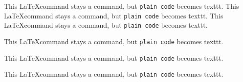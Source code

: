 This \LaTeX command stays a command, but \texttt{plain code} becomes texttt.
This \LaTeX command stays a command, but \texttt{plain code} becomes texttt.
This \LaTeX command stays a command, but \texttt{plain code} becomes texttt.
\begin{frame}[t]
This \LaTeX command stays a command, but \texttt{plain code} becomes texttt.
\end{frame}

\begin{frame}[t]
This \LaTeX command stays a command, but \texttt{plain code} becomes texttt.
\end{frame}

\begin{frame}[t]
This \LaTeX command stays a command, but \texttt{plain code} becomes texttt.
\end{frame}

